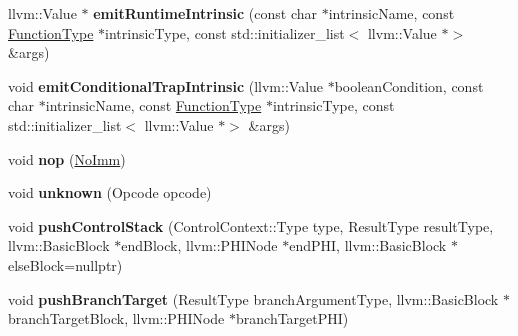 \begin{DoxyCompactItemize}
\item 
\mbox{\label{struct_l_l_v_m_j_i_t_1_1_emit_function_context_ae24b12abce1a593df666453402f8be74}} 
llvm\+::\+Value $\ast$ {\bfseries emit\+Runtime\+Intrinsic} (const char $\ast$intrinsic\+Name, const \mbox{\hyperlink{struct_i_r_1_1_function_type}{Function\+Type}} $\ast$intrinsic\+Type, const std\+::initializer\+\_\+list$<$ llvm\+::\+Value $\ast$$>$ \&args)
\item 
\mbox{\label{struct_l_l_v_m_j_i_t_1_1_emit_function_context_a3d2e2b401d8e0a90d25780423628fb32}} 
void {\bfseries emit\+Conditional\+Trap\+Intrinsic} (llvm\+::\+Value $\ast$boolean\+Condition, const char $\ast$intrinsic\+Name, const \mbox{\hyperlink{struct_i_r_1_1_function_type}{Function\+Type}} $\ast$intrinsic\+Type, const std\+::initializer\+\_\+list$<$ llvm\+::\+Value $\ast$$>$ \&args)
\item 
\mbox{\label{struct_l_l_v_m_j_i_t_1_1_emit_function_context_a0fefae772b8d178829f119244b925077}} 
void {\bfseries nop} (\mbox{\hyperlink{struct_i_r_1_1_no_imm}{No\+Imm}})
\item 
\mbox{\label{struct_l_l_v_m_j_i_t_1_1_emit_function_context_a9a8c63b17a2bed8aef984d54e0430b64}} 
void {\bfseries unknown} (Opcode opcode)
\item 
\mbox{\label{struct_l_l_v_m_j_i_t_1_1_emit_function_context_a1c53936567c12233d07b477d3b809aca}} 
void {\bfseries push\+Control\+Stack} (Control\+Context\+::\+Type type, Result\+Type result\+Type, llvm\+::\+Basic\+Block $\ast$end\+Block, llvm\+::\+P\+H\+I\+Node $\ast$end\+P\+HI, llvm\+::\+Basic\+Block $\ast$else\+Block=nullptr)
\item 
\mbox{\label{struct_l_l_v_m_j_i_t_1_1_emit_function_context_aa68beb1908a4dd9fa0e0dbf6c66afb18}} 
void {\bfseries push\+Branch\+Target} (Result\+Type branch\+Argument\+Type, llvm\+::\+Basic\+Block $\ast$branch\+Target\+Block, llvm\+::\+P\+H\+I\+Node $\ast$branch\+Target\+P\+HI)
\item 
\mbox{\label{struct_l_l_v_m_j_i_t_1_1_emit_function_context_a0596de3b58538779dda6a449f6e5ea79}} 

\end{DoxyCompactItemize}
